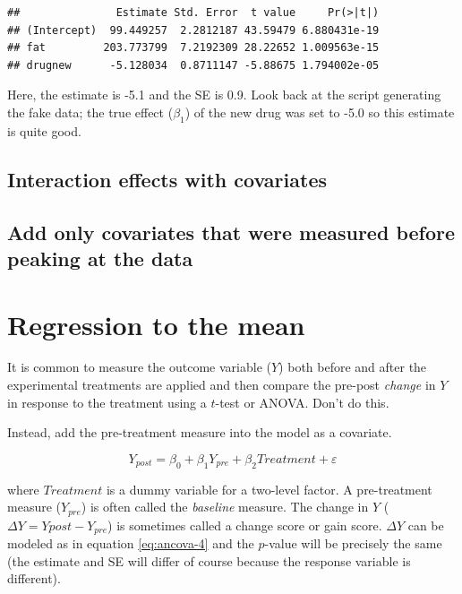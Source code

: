 \documentclass[]{book}
\begin{document}
\begin{verbatim}
##               Estimate Std. Error  t value     Pr(>|t|)
## (Intercept)  99.449257  2.2812187 43.59479 6.880431e-19
## fat         203.773799  7.2192309 28.22652 1.009563e-15
## drugnew      -5.128034  0.8711147 -5.88675 1.794002e-05
\end{verbatim}

Here, the estimate is -5.1 and the SE is 0.9. Look back at the script
generating the fake data; the true effect (\(\beta_1\)) of the new drug
was set to -5.0 so this estimate is quite good.

\subsection{Interaction effects with
covariates}\label{interaction-effects-with-covariates}

\subsection{Add only covariates that were measured before peaking at the
data}\label{add-only-covariates-that-were-measured-before-peaking-at-the-data}

\section{Regression to the mean}\label{regression-to-the-mean}

It is common to measure the outcome variable (\(Y\)) both before and
after the experimental treatments are applied and then compare the
pre-post \emph{change} in \(Y\) in response to the treatment using a
\(t\)-test or ANOVA. Don't do this.

Instead, add the pre-treatment measure into the model as a covariate.

\begin{equation}
Y_{post} = \beta_0 + \beta_1 Y_{pre} + \beta_2 Treatment + \varepsilon
\label{eq:ancova-4}
\end{equation}

where \(Treatment\) is a dummy variable for a two-level factor. A
pre-treatment measure (\(Y_{pre}\)) is often called the \emph{baseline}
measure. The change in \(Y\) (\(\Delta Y = Y{post} - Y_{pre}\)) is
sometimes called a change score or gain score. \(\Delta Y\) can be
modeled as in equation \eqref{eq:ancova-4} and the \(p\)-value will be
precisely the same (the estimate and SE will differ of course because
the response variable is different).
\end{document}
